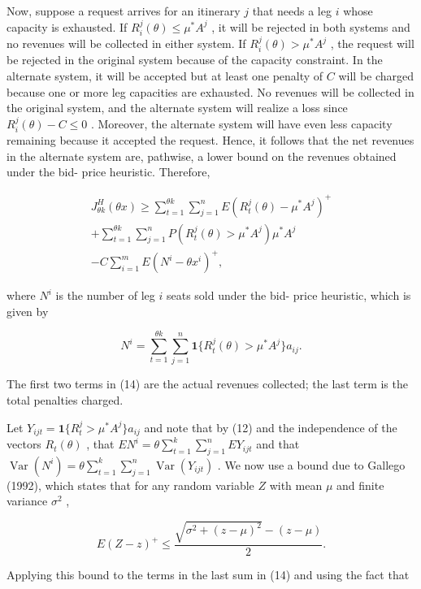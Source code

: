 Now, suppose a request arrives for an itinerary \(j\) that needs a leg
\(i\) whose capacity is exhausted. If
\(R_{i}^{j}(\theta) \leq \mu^{*} A^{j}\) , it will be rejected in both
systems and no revenues will be collected in either system. If
\(R_{i}^{j}(\theta) > \mu^{*} A^{j}\) , the request will be rejected in
the original system because of the capacity constraint. In the alternate
system, it will be accepted but at least one penalty of \(C\) will be
charged because one or more leg capacities are exhausted. No revenues
will be collected in the original system, and the alternate system will
realize a loss since \(R_{i}^{j}(\theta) - C \leq 0\) . Moreover, the
alternate system will have even less capacity remaining because it
accepted the request. Hence, it follows that the net revenues in the
alternate system are, pathwise, a lower bound on the revenues obtained
under the bid- price heuristic. Therefore,

\[
\begin{array}{l}{{J_{\theta k}^{H}(\theta x)\geq\sum_{t=1}^{\theta k}\sum_{j=1}^{n}E(R_{t}^{j}(\theta)-\mu^{*}A^{j})^{+}}}\\ {{+\sum_{t=1}^{\theta k}\sum_{j=1}^{n}P(R_{t}^{j}(\theta)>\mu^{*}A^{j})\mu^{*}A^{j}}}\\ {{-C\sum_{i=1}^{m}E(N^{i}-\theta x^{i})^{+},}}\end{array} \tag{14}
\]

where \(N^{i}\) is the number of leg \(i\) seats sold under the bid-
price heuristic, which is given by

\[
N^{i} = \sum_{t = 1}^{\theta k} \sum_{j = 1}^{n} \mathbf{1}\{R_{t}^{j}(\theta) > \mu^{*} A^{j}\} a_{ij}.
\]

The first two terms in (14) are the actual revenues collected; the last
term is the total penalties charged.

Let \(Y_{ijt} = \mathbf{1}\{R_{t}^{j} > \mu^{*} A^{j}\} a_{ij}\) and
note that by (12) and the independence of the vectors \(R_{t}(\theta)\)
, that \(EN^{i} = \theta \sum_{t = 1}^{k} \sum_{j = 1}^{n} EY_{ijt}\)
and that
\(\operatorname {Var}(N^{i}) = \theta \sum_{t = 1}^{k} \sum_{j = 1}^{n} \operatorname {Var}(Y_{ijt})\)
. We now use a bound due to Gallego (1992), which states that for any
random variable \(Z\) with mean \(\mu\) and finite variance
\(\sigma^{2}\) ,

\[
E(Z - z)^{+} \leq \frac{\sqrt{\sigma^{2} + (z - \mu)^{2}} - (z - \mu)}{2}.
\]

Applying this bound to the terms in the last sum in (14) and using the
fact that

